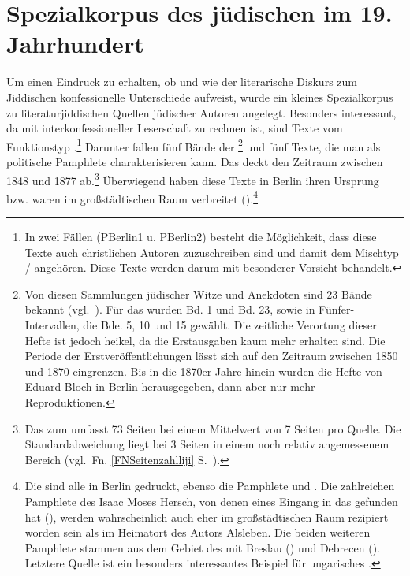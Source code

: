  \section{Spezialkorpus des jüdischen  im 19. Jahrhundert} \label{spezialjüliji}
 Um einen Eindruck zu erhalten, ob und wie der literarische Diskurs zum Jiddischen konfessionelle Unterschiede aufweist, wurde ein kleines Spezialkorpus zu literaturjiddischen Quellen jüdischer Autoren angelegt. Besonders interessant, da mit interkonfessioneller Leserschaft zu rechnen ist, sind Texte vom Funktionstyp .\footnote{In zwei Fällen (PBerlin1 u. PBerlin2) besteht die Möglichkeit, dass diese Texte auch christlichen Autoren zuzuschreiben sind und damit dem Mischtyp / angehören. Diese Texte werden darum mit besonderer Vorsicht behandelt.} Darunter fallen fünf Bände der \footnote{Von diesen Sammlungen jüdischer Witze und Anekdoten sind 23 Bände bekannt (vgl.\, \citealt{Gruschka2003}). Für das  wurden Bd. 1 und Bd. 23, sowie in Fünfer-Intervallen, die Bde. 5, 10 und 15 gewählt. Die zeitliche Verortung dieser Hefte ist jedoch heikel, da die Erstausgaben kaum mehr erhalten sind. Die Periode der Erstveröffentlichungen lässt sich auf den Zeitraum zwischen 1850 und 1870 eingrenzen. Bis in die 1870er Jahre hinein wurden die Hefte von Eduard Bloch in Berlin herausgegeben, dann aber nur mehr Reproduktionen.} und fünf Texte, die man als politische Pamphlete charakterisieren kann. Das  deckt den Zeitraum zwischen 1848 und 1877 ab.\footnote{Das  zum  umfasst 73 Seiten bei einem Mittelwert von 7 Seiten pro Quelle. Die Standardabweichung liegt bei 3 Seiten in einem noch relativ angemessenem Bereich (vgl.\, Fn. \ref{FNSeitenzahlliji} S.\, \pageref{FNSeitenzahlliji}).} Überwiegend haben diese Texte in Berlin ihren Ursprung bzw. waren im großstädtischen Raum verbreitet (\citealt{Gruschka2003}).\footnote{Die  sind alle in Berlin gedruckt, ebenso die Pamphlete  und . Die zahlreichen Pamphlete des Isaac Moses Hersch, von denen eines Eingang in das  gefunden hat (), werden wahrscheinlich auch eher im großstädtischen Raum rezipiert worden sein als im Heimatort des Autors Alsleben. Die beiden weiteren Pamphlete stammen aus dem Gebiet des  mit Breslau () und Debrecen (). Letztere Quelle ist ein besonders interessantes Beispiel für ungarisches \hai{{\LiJi}}.}  	
    
